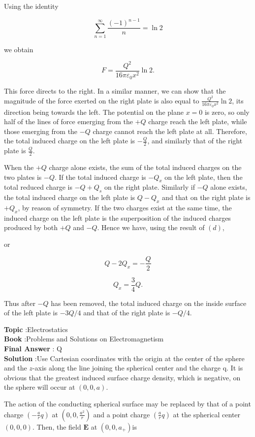 \documentclass[10pt]{article}
\begin{document}
Using the identity

$$
\sum_{n=1}^{\infty} \frac{(-1)^{n-1}}{n}=\ln 2
$$

we obtain

$$
F=\frac{Q^{2}}{16 \pi \varepsilon_{0} x^{2}} \ln 2 .
$$

This force directs to the right. In a similar manner, we can show that the magnitude of the force exerted on the right plate is also equal to $\frac{Q^{2}}{16 \pi \varepsilon_{0} x^{2}} \ln 2$, its direction being towards the left.
 The potential on the plane $x=0$ is zero, so only half of the lines of force emerging from the $+Q$ charge reach the left plate, while those emerging from the $-Q$ charge cannot reach the left plate at all. Therefore, the total induced charge on the left plate is $-\frac{Q}{2}$, and similarly that of the right plate is $\frac{Q}{2}$.

 When the $+Q$ charge alone exists, the sum of the total induced charges on the two plates is $-Q$. If the total induced charge is $-Q_{x}$ on the left plate, then the total reduced charge is $-Q+Q_{s}$ on the right plate. Similarly if $-Q$ alone exists, the total induced charge on the left plate is $Q-Q_{x}$ and that on the right plate is $+Q_{x}$, by reason of symmetry. If the two charges exist at the same time, the induced charge on the left plate is the superposition of the induced charges produced by both $+Q$ and $-Q$. Hence we have, using the result of $(d)$,

or

$$
Q-2 Q_{x}=-\frac{Q}{2}
$$

$$
Q_{x}=\frac{3}{4} Q .
$$

Thus after $-Q$ has been removed, the total induced charge on the inside surface of the left plate is $-3 Q / 4$ and that of the right plate is $-Q / 4$.

\textbf{Topic} :Electrostatics\\
\textbf{Book} :Problems and Solutions on Electromagnetism\\
\textbf{Final Answer} : Q\\


\textbf{Solution} :Use Cartesian coordinates with the origin at the center of the sphere and the $z$-axis along the line joining the spherical center and the charge q. It is obvious that the greatest induced surface charge density, which is negative, on the sphere will occur at $(0,0, a)$.

The action of the conducting spherical surface may be replaced by that of a point charge $\left(-\frac{a}{r} q\right)$ at $\left(0,0, \frac{a^{2}}{r}\right)$ and a point charge $\left(\frac{a}{r} q\right)$ at the spherical center $(0,0,0)$. Then, the field $\boldsymbol{E}$ at $\left(0,0, a_{+}\right)$is
\end{document}
